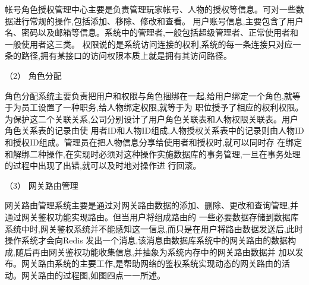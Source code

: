 帐号角色授权管理中心主要是负责管理玩家帐号、人物的授权等信息。可对一些数据进行常规的操作,包括添加、移除、修改和查看。
用户账号信息,主要包含了用户名、密码以及邮箱等信息。系统中的管理者,一般包括超级管理者、正常使用者和一般使用者这三类。
权限说的是系统访问连接的权利,系统的每一条连接只对应一条的路径,拥有某接口的访问权限本质上就是拥有其访问路径。

（2） 角色分配


角色分配系统主要负责把用户和权限与角色捆绑在一起,给用户绑定一个角色,就等于为员工设置了一种职务,给人物绑定权限,就等于为
职位授予了相应的权利权限。为保护这二个关联关系,公司分别设计了用户角色关联表和人物权限关联表。用户角色关系表的记录由使
用者ID和人物ID组成,人物授权关系表中的记录则由人物ID和授权ID组成。管理员在把人物信息分享给使用者和授权时,就可以同时存
在绑定和解绑二种操作,在实现时必须对这种操作实施数据库的事务管理,一旦在事务处理的过程中出现了出错,就可以及时地对操作进
行回滚。

（3） 网关路由管理


网关路由管理系统主要是通过对网关路由数据的添加、删除、更改和查询管理,并通过网关鉴权功能实现路由。但当用户将组成路由的
一些必要数据存储到数据库系统中时,网关鉴权系统并不能感知这一信息,而只是在用户将路由数据发送后,此时操作系统才会向Redis
发出一个消息,该消息由数据库系统中的网关路由的数据构成,随后再由网关鉴权功能收集信息,并抽象为系统内存中的网关路由数据并
加以发布。网关路由系统的主要工作,是帮助网络的鉴权系统实现动态的网关路由的活动。网关路由的过程图,如图四点一一所述。

